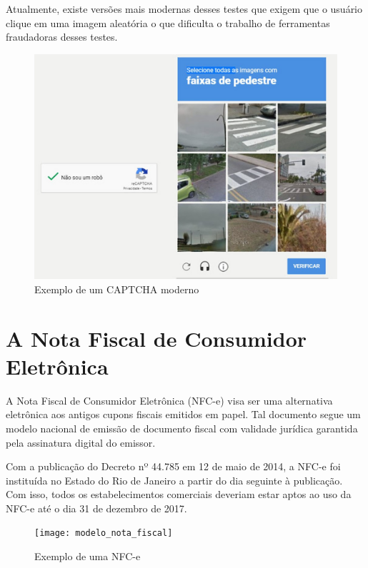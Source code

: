 Atualmente, existe versões mais modernas desses testes que exigem que o usuário clique em uma imagem aleatória o que dificulta o trabalho de ferramentas fraudadoras desses testes.

\begin{figure}[h]
    \centering
    \includegraphics[scale=0.15]{tcc/figures/captcha/recaptcha-post-g1.jpg}
    \caption{Exemplo de um CAPTCHA moderno}
    \label{fig-exemplo-captcha-alfanumerico}
\end{figure}

\section{A Nota Fiscal de Consumidor Eletrônica}\label{secNfce}

A Nota Fiscal de Consumidor Eletrônica (NFC-e) visa ser uma alternativa eletrônica aos antigos cupons fiscais emitidos em papel. Tal documento segue um modelo nacional de emissão de documento fiscal com validade jurídica garantida pela assinatura digital do emissor.

Com a publicação do Decreto nº 44.785 em 12 de maio de 2014, a NFC-e foi instituída no Estado do Rio de Janeiro a partir do dia seguinte à publicação. Com isso, todos os estabelecimentos comerciais deveriam estar aptos ao uso da NFC-e até o dia 31 de dezembro de 2017.

\begin{figure}[h]
    \centering
    \texttt{[image: modelo\_nota\_fiscal]}
    \caption{Exemplo de uma NFC-e}
    \label{modeloNfce}
\end{figure}

